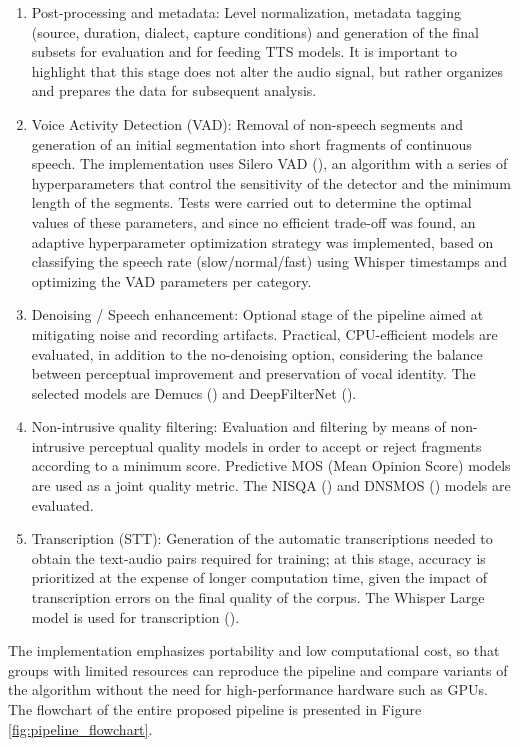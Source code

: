 \begin{enumerate}
\item Post-processing and metadata: Level normalization, metadata tagging (source, duration, dialect, capture conditions) and generation of the final subsets for evaluation and for feeding TTS models. It is important to highlight that this stage does not alter the audio signal, but rather organizes and prepares the data for subsequent analysis.
\item Voice Activity Detection (VAD): Removal of non-speech segments and generation of an initial segmentation into short fragments of continuous speech. The implementation uses Silero VAD (\cite{SileroVAD}), an algorithm with a series of hyperparameters that control the sensitivity of the detector and the minimum length of the segments. Tests were carried out to determine the optimal values of these parameters, and since no efficient trade-off was found, an adaptive hyperparameter optimization strategy was implemented, based on classifying the speech rate (slow/normal/fast) using Whisper timestamps and optimizing the VAD parameters per category.
\item Denoising / Speech enhancement: Optional stage of the pipeline aimed at mitigating noise and recording artifacts. Practical, CPU-efficient models are evaluated, in addition to the no-denoising option, considering the balance between perceptual improvement and preservation of vocal identity. The selected models are Demucs (\cite{demucs}) and DeepFilterNet (\cite{deepfilter}).
\item Non-intrusive quality filtering: Evaluation and filtering by means of non-intrusive perceptual quality models in order to accept or reject fragments according to a minimum score. Predictive MOS (Mean Opinion Score) models are used as a joint quality metric. The NISQA (\cite{nisqa}) and DNSMOS (\cite{dns_mos}) models are evaluated.
\item Transcription (STT): Generation of the automatic transcriptions needed to obtain the text-audio pairs required for training; at this stage, accuracy is prioritized at the expense of longer computation time, given the impact of transcription errors on the final quality of the corpus. The Whisper Large model is used for transcription (\cite{whisper}).
\end{enumerate}

The implementation emphasizes portability and low computational cost, so that groups with limited resources can reproduce the pipeline and compare variants of the algorithm without the need for high-performance hardware such as GPUs. The flowchart of the entire proposed pipeline is presented in Figure \ref{fig:pipeline_flowchart}.

